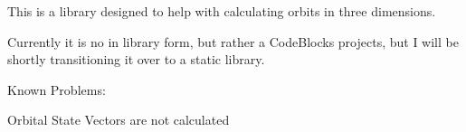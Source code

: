 This is a library designed to help with calculating orbits in three dimensions.

Currently it is no in library form, but rather a Code\+Blocks projects, but I will be shortly transitioning it over to a static library.

Known Problems\+:
\begin{DoxyItemize}
\item Orbital State Vectors are not calculated 
\end{DoxyItemize}